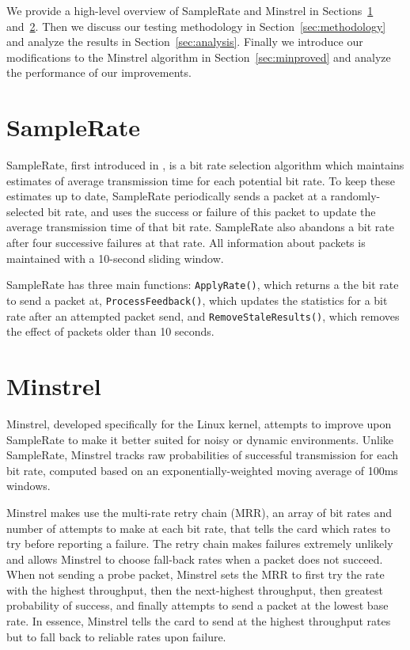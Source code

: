 \documentclass[twocolumn,10pt]{article}
\begin{document}
We provide a high-level overview of SampleRate and Minstrel in
Sections~\ref{sec:samplerate} and~\ref{sec:minstrel}.  Then we discuss
our testing methodology in Section~\ref{sec:methodology} and analyze
the results in Section~\ref{sec:analysis}.  Finally we introduce our
modifications to the Minstrel algorithm in Section~\ref{sec:minproved}
and analyze the performance of our improvements.

\section{SampleRate} \label{sec:samplerate}

SampleRate, first introduced in \cite{samplerate}, is a bit rate
selection algorithm which maintains estimates of average transmission
time for each potential bit rate. To keep these estimates up to date,
SampleRate periodically sends a packet at a randomly-selected bit
rate, and uses the success or failure of this packet to update the
average transmission time of that bit rate.  SampleRate also abandons
a bit rate after four successive failures at that rate.  All
information about packets is maintained with a 10-second sliding window.

SampleRate has three main functions: \texttt{ApplyRate()}, which
returns a the bit rate to send a packet at,
\texttt{ProcessFeedback()}, which updates the statistics for a
bit rate after an attempted packet send, and
\texttt{RemoveStaleResults()}, which removes the effect of packets
older than 10 seconds.

\section{Minstrel} \label{sec:minstrel}

Minstrel, developed specifically for the Linux kernel, attempts to
improve upon SampleRate to make it better suited for noisy or
dynamic environments.  Unlike SampleRate, Minstrel tracks raw
probabilities of successful transmission for each bit rate, computed
based on an exponentially-weighted moving average of 100ms windows.

Minstrel makes use the multi-rate retry chain (MRR), an array of bit rates
and number of attempts to make at each bit rate, that tells the card
which rates to try before reporting a failure.  The retry chain makes
failures extremely unlikely and allows Minstrel to choose fall-back
rates when a packet does not succeed.  When not sending a probe packet,
Minstrel sets the MRR to first try the rate with the highest throughput, 
then the next-highest throughput, then greatest probability of success, 
and finally attempts to send a packet at the lowest base rate.  
In essence, Minstrel tells the card to send at the highest throughput 
rates but to fall back to reliable rates upon failure.
\end{document}
